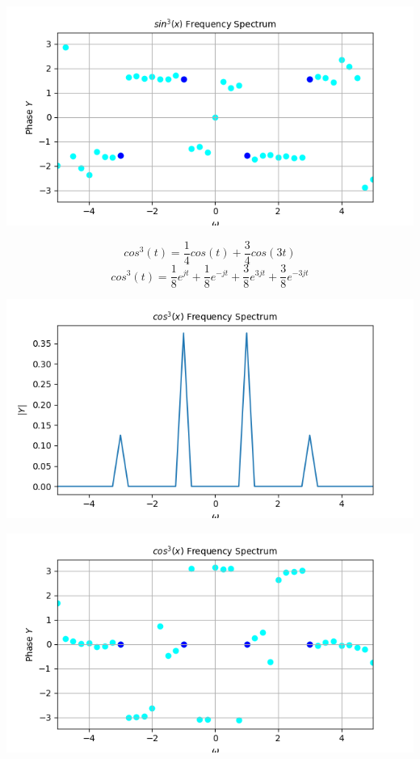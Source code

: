 \documentclass[12pt, a4paper]{report}
\begin{document}
\begin{center}
	\includegraphics[scale=0.72]{Figure_6.png} 
	\label{fig:rawdata}
\end{center}

\begin{equation*}
cos^3(t) = \frac{1}{4}cos(t) + \frac{3}{4}cos(3t)
\end{equation*}
\begin{equation*}
cos^3(t) = \frac{1}{8}e^{jt} + \frac{1}{8}e^{-jt} + \frac{3}{8}e^{3jt} + \frac{3}{8}e^{-3jt}
\end{equation*}

\begin{center}
	\includegraphics[scale=0.72]{Figure_7.png} 
	\label{fig:rawdata}
\end{center}
\clearpage
\begin{center}
	\includegraphics[scale=0.8]{Figure_8.png} 
	\label{fig:rawdata}
\end{center}
\end{document}
